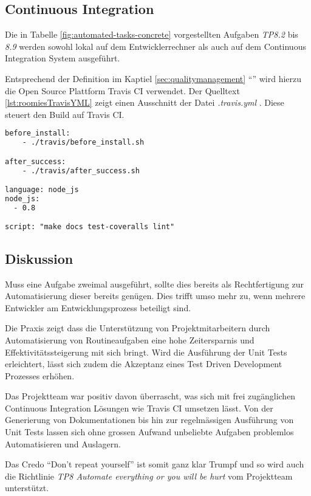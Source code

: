 \subsection*{Continuous Integration}

Die in Tabelle \ref{fig:automated-tasks-concrete} vorgestellten Aufgaben \emph{TP8.2} bis \emph{8.9} werden sowohl lokal auf dem Entwicklerrechner als auch auf dem Continuous Integration System ausgeführt.

Entsprechend der Definition im Kaptiel \ref{sec:qualitymanagement} ``'' wird hierzu die Open Source Plattform Travis CI \cite{TravisCI} verwendet. Der Quelltext \ref{lst:roomiesTravisYML} zeigt einen Ausschnitt der Datei \emph{.travis.yml} \cite{RoomiesTravisYML}. Diese steuert den Build auf Travis CI.

\begin{lstlisting}[language=XML, firstnumber=5, caption={Ausschnit aus .travis.yml \cite{RoomiesTravisYML}}, label=lst:roomiesTravisYML]
before_install:
    - ./travis/before_install.sh

after_success:
    - ./travis/after_success.sh

language: node_js
node_js:
  - 0.8

script: "make docs test-coveralls lint"
\end{lstlisting}

\subsection*{Diskussion}
Muss eine Aufgabe zweimal ausgeführt, sollte dies bereits als Rechtfertigung zur Automatisierung dieser bereits genügen. Dies trifft umso mehr zu, wenn mehrere Entwickler am Entwicklungsprozess beteiligt sind.

Die Praxis zeigt dass die Unterstützung von Projektmitarbeitern durch Automatisierung von Routineaufgaben eine hohe Zeitersparnis und Effektivitätssteigerung mit sich bringt. Wird die Ausführung der Unit Tests erleichtert, lässt sich zudem die Akzeptanz eines Test Driven Development Prozesses erhöhen.

Das Projektteam war positiv davon überrascht, was sich mit frei zugänglichen Continuous Integration Lösungen wie Travis CI \cite{TravisCI} umsetzen lässt. Von der Generierung von Dokumentationen bis hin zur regelmässigen Ausführung von Unit Tests lassen sich ohne grossen Aufwand unbeliebte Aufgaben problemlos Automatisieren und Auslagern.

Das Credo ``Don't repeat yourself'' ist somit ganz klar Trumpf und so wird auch die Richtlinie \emph{TP8 Automate everything or you will be hurt} vom Projektteam unterstützt.